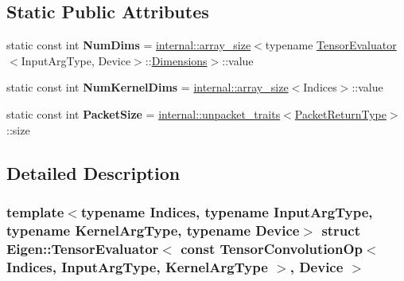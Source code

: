 \subsection*{Static Public Attributes}
\begin{DoxyCompactItemize}
\item 
\mbox{\label{struct_eigen_1_1_tensor_evaluator_3_01const_01_tensor_convolution_op_3_01_indices_00_01_input_ar27ed28dccb4630db304c3ad822c3d857_a62f318c053a534296fa31bfd3b317bde}} 
static const int {\bfseries Num\+Dims} = \hyperlink{struct_eigen_1_1internal_1_1array__size}{internal\+::array\+\_\+size}$<$typename \hyperlink{struct_eigen_1_1_tensor_evaluator}{Tensor\+Evaluator}$<$Input\+Arg\+Type, Device$>$\+::\hyperlink{struct_eigen_1_1_d_sizes}{Dimensions}$>$\+::value
\item 
\mbox{\label{struct_eigen_1_1_tensor_evaluator_3_01const_01_tensor_convolution_op_3_01_indices_00_01_input_ar27ed28dccb4630db304c3ad822c3d857_adaceaae2bca816a87eb9ef70ef978d9d}} 
static const int {\bfseries Num\+Kernel\+Dims} = \hyperlink{struct_eigen_1_1internal_1_1array__size}{internal\+::array\+\_\+size}$<$Indices$>$\+::value
\item 
\mbox{\label{struct_eigen_1_1_tensor_evaluator_3_01const_01_tensor_convolution_op_3_01_indices_00_01_input_ar27ed28dccb4630db304c3ad822c3d857_ab07aa635919d742b34d5f7e6185c3180}} 
static const int {\bfseries Packet\+Size} = \hyperlink{struct_eigen_1_1internal_1_1unpacket__traits}{internal\+::unpacket\+\_\+traits}$<$\hyperlink{group___sparse_core___module}{Packet\+Return\+Type}$>$\+::size
\end{DoxyCompactItemize}


\subsection{Detailed Description}
\subsubsection*{template$<$typename Indices, typename Input\+Arg\+Type, typename Kernel\+Arg\+Type, typename Device$>$\newline
struct Eigen\+::\+Tensor\+Evaluator$<$ const Tensor\+Convolution\+Op$<$ Indices, Input\+Arg\+Type, Kernel\+Arg\+Type $>$, Device $>$}




